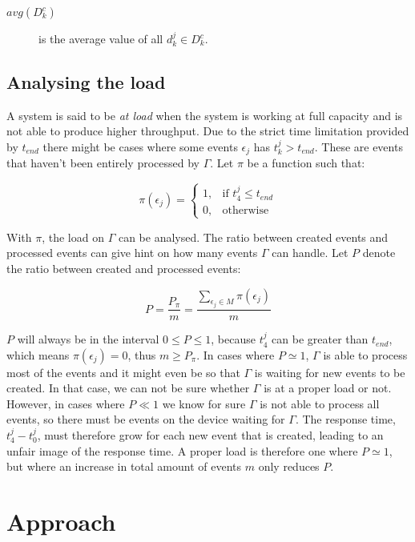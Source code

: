 \begin{description}

    \item[$avg(D_k^c)$] is the average value of all $d_k^j \in D_k^c$.

\end{description}

\subsection{Analysing the load}
\label{sec:load}

A system is said to be \textit{at load} when the system is working at full
capacity and is not able to produce higher throughput. Due to the
strict time limitation provided by $t_{end}$ there might be cases where some
events $\epsilon_j$ has $t_k^j > t_{end}$. These are events that haven't
been entirely processed by $\Gamma$. Let $\pi$ be a function such that:

\[
    \pi(\epsilon_j) =
\begin{cases}
    1, & \text{if } t_4^j \leq t_{end} \\
    0, & \text{otherwise}
\end{cases}
\]

With $\pi$, the load on $\Gamma$ can be analysed. The ratio between created
events and processed events can give hint on how many events $\Gamma$ can
handle. Let $P$ denote the ratio between created and processed events:

$$
P = \frac{P_\pi}{m} = \frac{\sum_{\epsilon_j \in M}{\pi(\epsilon_j)}}{m}
$$

$P$ will always be in the interval $0 \leq P \leq 1$, because $t_4^j$ can be
greater than $t_{end}$, which means $\pi(\epsilon_j) = 0$, thus $m \geq P_\pi$.
In cases where $P \simeq 1$, $\Gamma$ is able to process most of the events and
it might even be so that $\Gamma$ is waiting for new events to be created. In
that case, we can not be sure whether $\Gamma$ is at a proper load or not.
However, in cases where $P \ll 1$ we know for sure $\Gamma$ is not able to
process all events, so there must be events on the device waiting for $\Gamma$.
The response time, $t_4^j - t_0^j$, must therefore grow for each new event that
is created, leading to an unfair image of the response time. A proper load is
therefore one where $P \simeq 1$, but where an increase in total amount of
events $m$ only reduces $P$.

\section{Approach}


